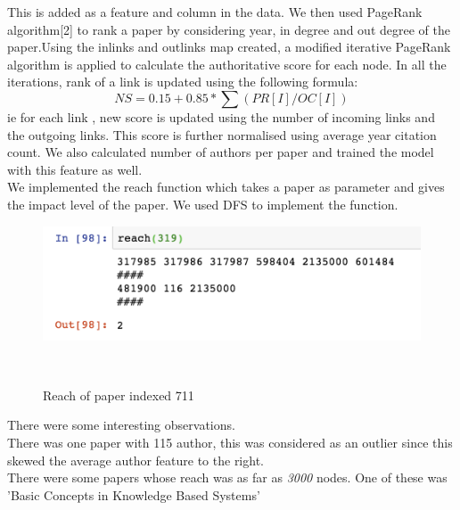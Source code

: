 \documentclass[a4paper, 11pt]{article}
\begin{document}
\FloatBarrier
This is added as a feature and column in the data. We then used PageRank algorithm[2] to rank a paper by considering year, in degree and out degree of the paper.Using the inlinks and outlinks map created, a modified iterative PageRank algorithm is applied to  calculate the authoritative score for each node. In all the iterations, rank of a link is updated using the following formula:
\[ NS = 0.15 + 0.85 * \sum (PR[I]/OC[I]) \]
ie for each link , new score is updated using the number of incoming links and the outgoing links. This score is further normalised using average year citation count. 
We also calculated number of authors per paper and trained the model with this feature as well. \\
We implemented the reach function which takes a paper as parameter and gives the impact level of the paper. We used DFS to implement the function. 

\begin{figure}[ht]
  \includegraphics[width=0.6\columnwidth]{Reach.png}
  \caption{Reach of paper indexed 711}~\label{fig:Reach}
\end{figure}
\FloatBarrier
There were some interesting observations.\\

There was one paper with 115 author, this was considered as an outlier since this skewed the average author feature to the right. \\

There were some papers whose reach was as far as \textit{3000} nodes. One of these was  'Basic Concepts in Knowledge Based Systems'

\end{document}
